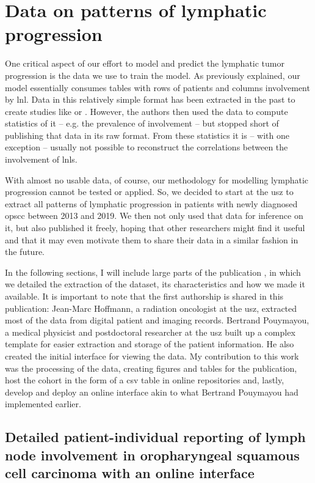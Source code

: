 \documentclass[\relativeRoot/main.tex]{subfiles}
\begin{document}
\chapter{Data on patterns of lymphatic progression}
\label{chap:dataset}

One critical aspect of our effort to model and predict the lymphatic tumor progression is the data we use to train the model. As previously explained, our model essentially consumes tables with rows of patients and columns involvement by \gls{lnl}. Data in this relatively simple format has been extracted in the past to create studies like \cite{candela_patterns_1990} or \cite{shah_patterns_1990}. However, the authors then used the data to compute statistics of it -- e.g. the prevalence of involvement -- but stopped short of publishing that data in its raw format. From these statistics it is -- with one exception \cite{sanguineti_defining_2009} -- usually not possible to reconstruct the correlations between the involvement of \glspl{lnl}.

With almost no usable data, of course, our methodology for modelling lymphatic progression cannot be tested or applied. So, we decided to start at the \gls{usz} to extract all patterns of lymphatic progression in patients with newly diagnosed \gls{opscc} between 2013 and 2019. We then not only used that data for inference on it, but also published it freely, hoping that other researchers might find it useful and that it may even motivate them to share their data in a similar fashion in the future.

In the following sections, I will include large parts of the publication \cite{ludwig_detailed_2022}, in which we detailed the extraction of the dataset, its characteristics and how we made it available. It is important to note that the first authorship is shared in this publication: Jean-Marc Hoffmann, a radiation oncologist at the \gls{usz}, extracted most of the data from digital patient and imaging records. Bertrand Pouymayou, a medical physicist and postdoctoral researcher at the \gls{usz} built up a complex template for easier extraction and storage of the patient information. He also created the initial interface for viewing the data. My contribution to this work was the processing of the data, creating figures and tables for the publication, host the cohort in the form of a \gls{csv} table in online repositories and, lastly, develop and deploy an online interface akin to what Bertrand Pouymayou had implemented earlier.

\section[Detailed reporting of involvement in OPSCC]{Detailed patient-individual reporting of lymph node involvement in oropharyngeal squamous cell carcinoma with an online interface}
\label{sec:dataset:paper}




\end{document}
